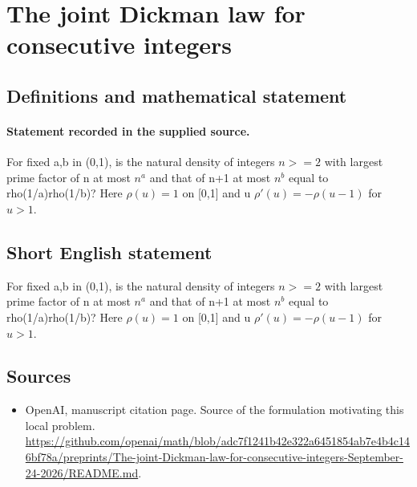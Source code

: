 \documentclass[11pt]{article}
\begin{document}
\section*{The joint Dickman law for consecutive integers}\label{statement}
\subsection{Definitions and mathematical statement}
\paragraph{Statement recorded in the supplied source.}
For fixed a,b in (0,1), is the natural density of integers $n>=2$ with largest prime factor of n at most $n^a$ and that of n+1 at most $n^b$ equal to rho(1/a)rho(1/b)? Here $\rho (u)=1$ on [0,1] and u $\rho '(u)=-\rho (u-1)$ for $u>1$.
\subsection{Short English statement}
For fixed a,b in (0,1), is the natural density of integers $n>=2$ with largest prime factor of n at most $n^a$ and that of n+1 at most $n^b$ equal to rho(1/a)rho(1/b)? Here $\rho (u)=1$ on [0,1] and u $\rho '(u)=-\rho (u-1)$ for $u>1$.
\subsection{Sources}
\begin{itemize}
\item[S1] OpenAI, manuscript citation page. Source of the formulation motivating this local problem.
\url{https://github.com/openai/math/blob/adc7f1241b42e322a6451854ab7e4b4c146bf78a/preprints/The-joint-Dickman-law-for-consecutive-integers-September-24-2026/README.md}.
\end{itemize}
\end{document}
